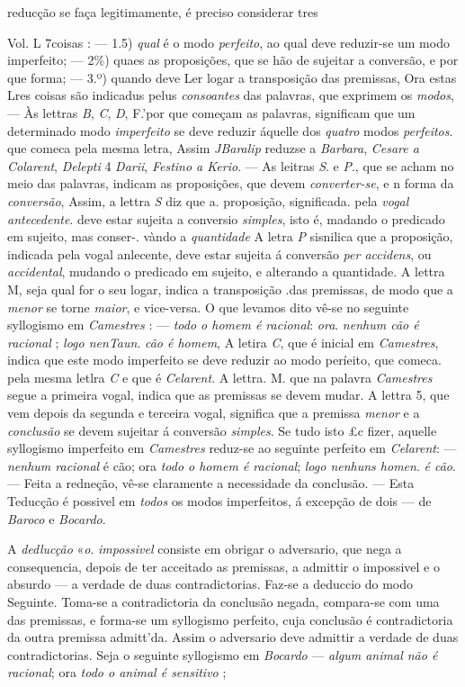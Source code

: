 reducção se faça legitimamente, é preciso considerar tres\par Vol. L 7coisas : --- 1.5) \emph{qual} é o modo \emph{perfeito}, ao qual deve reduzir-se um modo imperfeito; --- 2\%) quaes as proposições, que se hão de sujeitar a conversão, e por que forma; --- 3.º) quando deve Ler logar a transposição das premissas, Ora estas Lres coisas são indicadus pelus \emph{consoantes} das palavras, que exprimem os \emph{modos}, --- Às lettras \emph{B}, \emph{C}, \emph{D}, F.'por que começam as palavras, significam que um determinado modo \emph{imperfeito} se deve reduzir áquelle dos \emph{quatro} modos \emph{perfeitos}. que comeca pela mesma letra, Assim \emph{JBaralip} reduzse a \emph{Barbara}, \emph{Cesare a Colarent}, \emph{Delepti} 4 \emph{Darii}, \emph{Festino a Kerio}. --- As leitras \emph{S}. e \emph{P}., que se acham no meio das palavras, indicam as proposições, que devem \emph{converter-se}, e n forma da \emph{conversão}, Assim, a lettra \emph{S} diz que a. proposição, significada. pela \emph{vogal antecedente}. deve estar sujeita a conversio \emph{simples}, isto é, madando o predicado em sujeito, mas conser-. vàndo a \emph{quantidade} A letra \emph{P} sisnilica que a proposição, indicada pela vogal anlecente, deve estar sujeita á conversão \emph{per accidens}, ou \emph{accidental}, mudando o predicado em sujeito, e alterando a quantidade. A lettra M, seja qual for o seu logar, indica a transposição .das premissas, de modo que a \emph{menor} se torne \emph{maior}, e vice-versa. O que levamos dito vê-se no seguinte syllogismo em \emph{Camestres} : --- \emph{todo o homem é racional}: \emph{ora}. \emph{nenhum cão é racional} ; \emph{logo nenTaun}. \emph{cão é homem}, A letira \emph{C}, que é inicial em \emph{Camestres}, indica que este modo imperfeito se deve reduzir ao modo períeito, que comeca. pela mesma letlra \emph{C} e que é \emph{Celarent}. A lettra. M. que na palavra \emph{Camestres} segue a primeira vogal, indica que as premissas se devem mudar. A lettra 5, que vem depois da segunda e terceira vogal, significa que a premissa \emph{menor} e a \emph{conclusão} se devem sujeitar á conversão \emph{simples}. Se tudo isto £c fizer, aquelle syllogismo imperfeito em \emph{Camestres} reduz-se ao seguinte perfeito em \emph{Celarent}: --- \emph{nenhum racional} é cão; ora \emph{todo o homem é racional}; \emph{logo nenhuns homen}. \emph{é cão}. --- Feita a redneção, vê-se claramente a necessidade da conclusão. --- Esta Teducção é possivel em \emph{todos} os modos imperfeitos, á excepção de dois --- de \emph{Baroco} e \emph{Bocardo}.\par A \emph{dedlucção} «\emph{o}. \emph{impossivel} consiste em obrigar o adversario, que nega a consequencia, depois de ter acceitado as premissas, a admittir o impossivel e o absurdo --- a verdade de duas contradictorias. Faz-se a deduccio do modo Seguinte. Toma-se a contradictoria da conclusão negada, compara-se com uma das premissas, e forma-se um syllogismo perfeito, cuja conclusão é contradictoria da outra premissa admitt'da. Assim o adversario deve admittir a verdade de duas contradictorias. Seja o seguinte syllogismo em \emph{Bocardo} --- \emph{algum animal não é racional}; ora \emph{todo o animal é sensitivo} ; 
